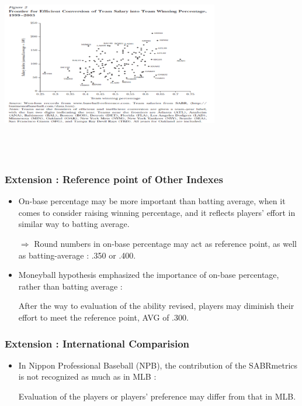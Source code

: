 \documentclass[dvipdfmx,12pt]{beamer}
\begin{document}
\begin{frame}

\begin{center}

\includegraphics[width=9.5cm,height=8.4cm]{Hakes_Sauer_F2.pdf}

\end{center}

\end{frame}

\begin{frame}\frametitle{Extension : Reference point of Other Indexes}

 \begin{itemize}
 
 \item On-base percentage may be more important than batting average, when it comes to consider raising winning percentage, and it reflects players' effort in similar way to batting average.
 
 $\Rightarrow$ Round numbers in on-base percentage may act as reference point, as well as batting-average : .350 or .400.

 \item Moneyball hypothesis emphasized the importance of on-base percentage, rather than batting average : 
 
 After the way to evaluation of the ability revised, players may diminish their effort to meet the reference point, AVG of .300.
 
 \end{itemize}

\end{frame}

\begin{frame}\frametitle{Extension : International Comparision}

 \begin{itemize}
 
 \item In Nippon Professional Baseball (NPB), the contribution of the SABRmetrics is not recognized as much as in MLB :
 
 Evaluation of the players or players' preference may differ from that in MLB.
 
 \end{itemize}

\end{frame}
\end{document}
